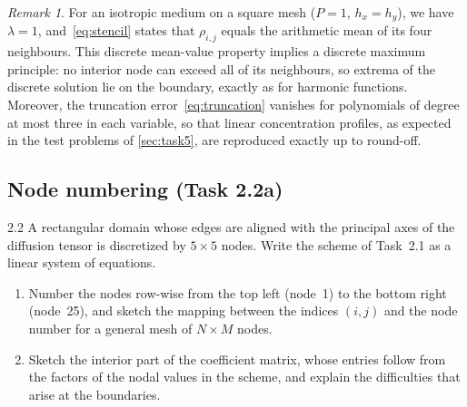 \documentclass[11pt,a4paper]{article}
\numberwithin{equation}{section}
\theoremstyle{definition}
\theoremstyle{remark}
\newtheorem{remark}{Remark}[section]
\begin{document}
\begin{remark}\label{rem:meanvalue}
  For an isotropic medium on a square mesh ($P = 1$, $h_x = h_y$), we have $\lambda = 1$,
  and~\eqref{eq:stencil} states that $\rho_{i,j}$ equals the arithmetic mean of its four
  neighbours. This discrete mean-value property implies a discrete maximum principle: no
  interior node can exceed all of its neighbours, so extrema of the discrete solution lie
  on the boundary, exactly as for harmonic functions. Moreover, the truncation
  error~\eqref{eq:truncation} vanishes for polynomials of degree at most three in each
  variable, so that linear concentration profiles, as expected in the test problems of
  \cref{sec:task5}, are reproduced exactly up to round-off.
\end{remark}

\subsection{Node numbering (Task 2.2a)}\label{sec:numbering}

\begin{task}{2.2}
  A rectangular domain whose edges are aligned with the principal axes of the diffusion
  tensor is discretized by $5\times5$ nodes. Write the scheme of Task~2.1 as a linear
  system of equations.
  \begin{enumerate}
    \item[(a)] Number the nodes row-wise from the top left (node~1) to the bottom right
      (node~25), and sketch the mapping between the indices $(i,j)$ and the node number
      for a general mesh of $N \times M$ nodes.
    \item[(b)] Sketch the interior part of the coefficient matrix, whose entries follow from
      the factors of the nodal values in the scheme, and explain the difficulties that
      arise at the boundaries.
  \end{enumerate}
\end{task}
\end{document}
